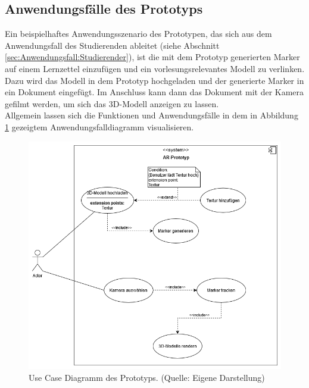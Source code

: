\subsection{Anwendungsfälle des Prototyps}
Ein beispielhaftes Anwendungsszenario des Prototypen, das sich aus dem Anwendungsfall des Studierenden ableitet (siehe Abschnitt \ref{sec:Anwendungsfall:Studierender}), ist die mit dem Prototyp generierten Marker auf einem Lernzettel einzufügen und ein vorlesungsrelevantes Modell zu verlinken. Dazu wird das Modell in dem Prototyp hochgeladen und der generierte Marker in ein Dokument eingefügt. Im Anschluss kann dann das Dokument mit der Kamera gefilmt werden, um sich das 3D-Modell anzeigen zu lassen.\\
Allgemein lassen sich die Funktionen und Anwendungsfälle in dem in Abbildung \ref{fig:Use-Cases} gezeigtem Anwendungsfalldiagramm visualisieren.
\begin{figure}[h!]
\centering
\includegraphics[width=1.0\textwidth]{Abbildungen/use-case-diagram.png}
\caption[Use Cases des Prototyps]{Use Case Diagramm des Prototyps. (Quelle: Eigene Darstellung)}
\label{fig:Use-Cases}
\end{figure}


